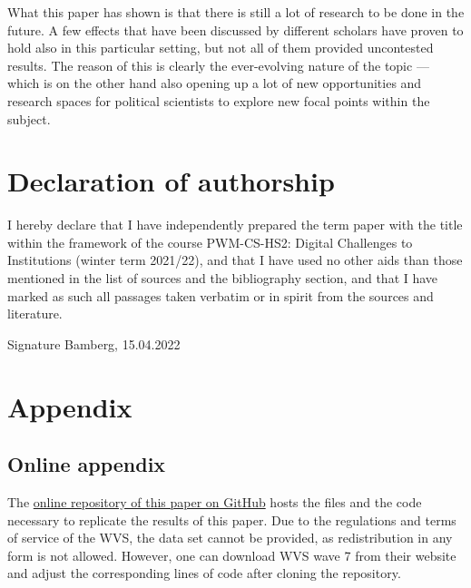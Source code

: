 \documentclass[
  12pt,
  english,
]{article}
\begin{document}
What this paper has shown is that there is still a lot of research to be
done in the future. A few effects that have been discussed by different
scholars have proven to hold also in this particular setting, but not
all of them provided uncontested results. The reason of this is clearly
the ever-evolving nature of the topic --- which is on the other hand
also opening up a lot of new opportunities and research spaces for
political scientists to explore new focal points within the subject.

\newpage{}

\hypertarget{declaration-of-authorship}{%
\section{Declaration of authorship}\label{declaration-of-authorship}}

I hereby declare that I have independently prepared the term paper with
the title within the framework of the course PWM-CS-HS2: Digital
Challenges to Institutions (winter term 2021/22), and that I have used
no other aids than those mentioned in the list of sources and the
bibliography section, and that I have marked as such all passages taken
verbatim or in spirit from the sources and literature.

\vfill

Signature \hfill Bamberg, 15.04.2022

\newpage{}

\hypertarget{appendix}{%
\section{Appendix}\label{appendix}}

\hypertarget{online-appendix}{%
\subsection{Online appendix}\label{online-appendix}}

The \href{https://github.com/FWisniewski44/digital-challenges}{online
repository of this paper on GitHub} hosts the files and the code
necessary to replicate the results of this paper. Due to the regulations
and terms of service of the WVS, the data set cannot be provided, as
redistribution in any form is not allowed. However, one can download WVS
wave 7 from their website and adjust the corresponding lines of code
after cloning the repository.

\newpage{}
\end{document}

